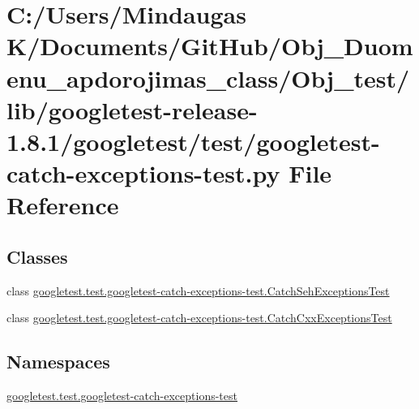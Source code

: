 \hypertarget{_obj__test_2lib_2googletest-release-1_88_81_2googletest_2test_2googletest-catch-exceptions-test_8py}{}\section{C\+:/\+Users/\+Mindaugas K/\+Documents/\+Git\+Hub/\+Obj\+\_\+\+Duomenu\+\_\+apdorojimas\+\_\+class/\+Obj\+\_\+test/lib/googletest-\/release-\/1.8.1/googletest/test/googletest-\/catch-\/exceptions-\/test.py File Reference}
\label{_obj__test_2lib_2googletest-release-1_88_81_2googletest_2test_2googletest-catch-exceptions-test_8py}
\subsection*{Classes}
\begin{DoxyCompactItemize}
\item 
class \mbox{\hyperlink{classgoogletest_1_1test_1_1googletest-catch-exceptions-test_1_1_catch_seh_exceptions_test}{googletest.\+test.\+googletest-\/catch-\/exceptions-\/test.\+Catch\+Seh\+Exceptions\+Test}}
\item 
class \mbox{\hyperlink{classgoogletest_1_1test_1_1googletest-catch-exceptions-test_1_1_catch_cxx_exceptions_test}{googletest.\+test.\+googletest-\/catch-\/exceptions-\/test.\+Catch\+Cxx\+Exceptions\+Test}}
\end{DoxyCompactItemize}
\subsection*{Namespaces}
\begin{DoxyCompactItemize}
\item 
 \mbox{\hyperlink{namespacegoogletest_1_1test_1_1googletest-catch-exceptions-test}{googletest.\+test.\+googletest-\/catch-\/exceptions-\/test}}
\end{DoxyCompactItemize}
